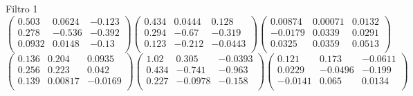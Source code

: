 Filtro 1
{ \small
\[
\begin{pmatrix}
  0.503 & 0.0624 & -0.123 \\
  0.278 & -0.536 & -0.392 \\
  0.0932 & 0.0148 & -0.13 \\
\end{pmatrix}
\begin{pmatrix}
  0.434 & 0.0444 & 0.128 \\
  0.294 & -0.67 & -0.319 \\
  0.123 & -0.212 & -0.0443 \\
\end{pmatrix}
\begin{pmatrix}
  0.00874 & 0.00071 & 0.0132 \\
  -0.0179 & 0.0339 & 0.0291 \\
  0.0325 & 0.0359 & 0.0513 \\
\end{pmatrix}
\]
\[
\begin{pmatrix}
  0.136 & 0.204 & 0.0935 \\
  0.256 & 0.223 & 0.042 \\
  0.139 & 0.00817 & -0.0169 \\
\end{pmatrix}
\begin{pmatrix}
  1.02 & 0.305 & -0.0393 \\
  0.434 & -0.741 & -0.963 \\
  0.227 & -0.0978 & -0.158 \\
\end{pmatrix}
\begin{pmatrix}
  0.121 & 0.173 & -0.0611 \\
  0.0229 & -0.0496 & -0.199 \\
  -0.0141 & 0.065 & 0.0134 \\
\end{pmatrix}
\]
}

